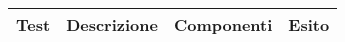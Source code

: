 \begin{table}[H]
	\begin{center}
		\begin{tabular}{| l | l | l | c |}
			\hline
			Test 					& Descrizione				& Componenti				 & Esito 					\\ \hline




























\end{tabular}
\end{center}
\end{table}

